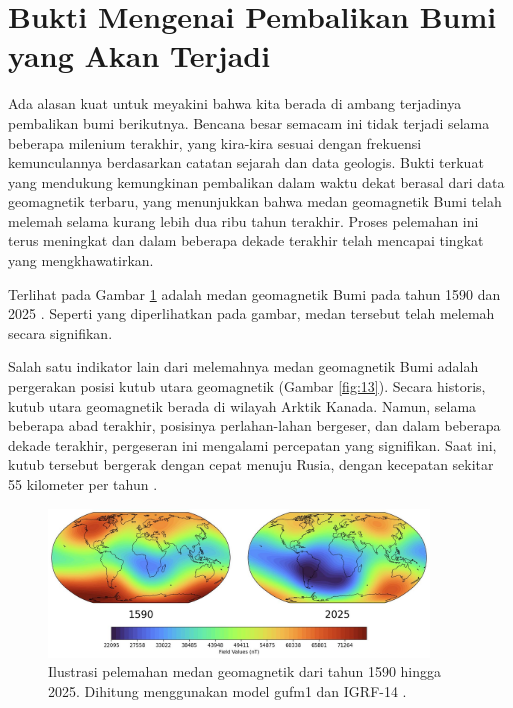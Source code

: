 \documentclass[10pt,twocolumn,letterpaper]{article}
\begin{document}
\section{Bukti Mengenai Pembalikan Bumi yang Akan Terjadi}

Ada alasan kuat untuk meyakini bahwa kita berada di ambang terjadinya pembalikan bumi berikutnya. Bencana besar semacam ini tidak terjadi selama beberapa milenium terakhir, yang kira-kira sesuai dengan frekuensi kemunculannya berdasarkan catatan sejarah dan data geologis. Bukti terkuat yang mendukung kemungkinan pembalikan dalam waktu dekat berasal dari data geomagnetik terbaru, yang menunjukkan bahwa medan geomagnetik Bumi telah melemah selama kurang lebih dua ribu tahun terakhir. Proses pelemahan ini terus meningkat dan dalam beberapa dekade terakhir telah mencapai tingkat yang mengkhawatirkan.

Terlihat pada Gambar \ref{fig:14} adalah medan geomagnetik Bumi pada tahun 1590 dan 2025 \cite{125,126}. Seperti yang diperlihatkan pada gambar, medan tersebut telah melemah secara signifikan.

Salah satu indikator lain dari melemahnya medan geomagnetik Bumi adalah pergerakan posisi kutub utara geomagnetik (Gambar \ref{fig:13}). Secara historis, kutub utara geomagnetik berada di wilayah Arktik Kanada. Namun, selama beberapa abad terakhir, posisinya perlahan-lahan bergeser, dan dalam beberapa dekade terakhir, pergeseran ini mengalami percepatan yang signifikan. Saat ini, kutub tersebut bergerak dengan cepat menuju Rusia, dengan kecepatan sekitar 55 kilometer per tahun \cite{124}.

\begin{figure}[t]
\begin{center}
\includegraphics[width=0.9\textwidth]{saa.jpg}
\end{center}
   \caption{Ilustrasi pelemahan medan geomagnetik dari tahun 1590 hingga 2025. Dihitung menggunakan model gufm1 dan IGRF-14 \cite{125,126}.}
\label{fig:14}
\end{figure}
\end{document}
